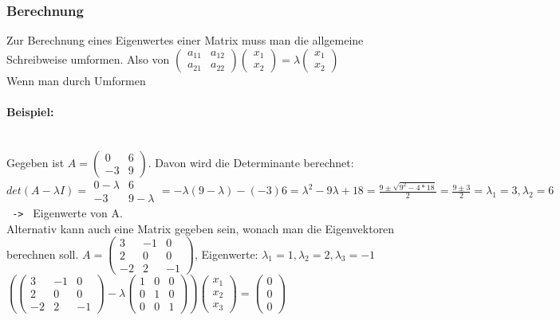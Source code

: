 \documentclass{article}
\newcommand{\paragraphlb}[1]{\paragraph{#1}\mbox{}\\}
\begin{document}
	\subsubsection{Berechnung}
	Zur Berechnung eines Eigenwertes einer Matrix muss man die allgemeine Schreibweise umformen. Also von $\begin{pmatrix} a_11 & a_12 \\ a_21 & a_22 \end{pmatrix}\begin{pmatrix} x_1 \\ x_2 \end{pmatrix}=\lambda \begin{pmatrix} x_1 \\ x_2 \end{pmatrix}$ \\
	Wenn man durch Umformen
	\paragraphlb{Beispiel:}
	Gegeben ist $A=\begin{pmatrix} 0 & 6 \\ -3 & 9 \end{pmatrix}$. Davon wird die Determinante berechnet: $det(A-\lambda I)=\begin{matrix} 0-\lambda & 6 \\ -3 & 9-\lambda \end{matrix}=-\lambda(9-\lambda)-(-3)6=\lambda^2-9\lambda+18=\frac{9\pm\sqrt{9^2-4*18}}{2}=\frac{9\pm3}{2}=\lambda_1=3,\lambda_2=6$\texttt{ -> } Eigenwerte von A. \\
	Alternativ kann auch eine Matrix gegeben sein, wonach man die Eigenvektoren berechnen soll. $A=\begin{pmatrix} 3 & -1 & 0 \\ 2 & 0 & 0 \\ -2 & 2 & -1 \end{pmatrix}$, Eigenwerte: $\lambda_1=1,\lambda_2=2,\lambda_3=-1$ \\
	$(\begin{pmatrix} 3 & -1 & 0 \\ 2 & 0 & 0 \\ -2 & 2 & -1 \end{pmatrix}-\lambda \begin{pmatrix} 1 & 0 & 0 \\ 0 & 1 & 0 \\ 0 & 0 & 1 \end{pmatrix})\begin{pmatrix} x_1 \\ x_2 \\ x_3 \end{pmatrix}=\begin{pmatrix} 0 \\ 0 \\ 0 \end{pmatrix}$ \\
\end{document}
